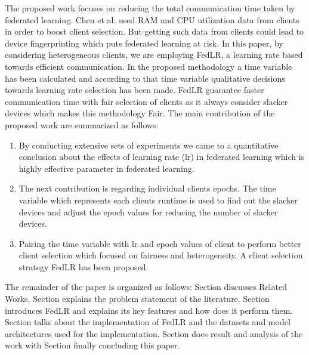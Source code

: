 \documentclass[conference]{IEEEtran}
\newcommand{\RNum}[1]{\uppercase\expandafter{\romannumeral #1\relax}}
\begin{document}
 The proposed work focuses on reducing the total communication time taken by federated learning. Chen et al. \cite{chen2023boosting} used RAM and CPU utilization data from clients in order to boost client selection. But getting such data from clients could lead to device fingerprinting \cite{radhakrishnan2014gtid} \cite{patwari2022dnn} which puts federated learning at risk.  In this paper, by considering heterogeneous clients, we are employing FedLR, a learning rate based towards efficient communication. In the proposed methodology a time variable has been calculated and according to that time variable qualitative decisions towards learning rate selection has been made.
FedLR guarantee faster communication time with fair selection of clients as it always consider slacker devices which makes this methodology Fair. The main contribution of the proposed work are summarized as follows:
\begin{enumerate}
	\item By conducting extensive sets of experiments we came to a quantitative conclusion about the effects of learning rate (lr) in federated learning which is highly effective parameter in federated learning.
	\item The next contribution is regarding individual clients epochs. The time variable which represents each clients runtime is used to find out the slacker devices and adjust the epoch values for reducing the number of slacker devices.
	\item Pairing the time variable with lr and epoch values of client to perform better client selection which focused on fairness and heterogeneity. A client selection strategy FedLR has been proposed.
\end{enumerate}

The remainder of the paper is organized as follows: Section \RNum{2} discusses Related Works. Section \RNum{3} explains the problem statement of the literature. Section \RNum{4} introduces FedLR and explains its key features and how does it perform them. Section \RNum{5} talks about the implementation of FedLR and the datasets and model architectures used for the implementation. Section \RNum{6} does result and analysis of the work with Section \RNum{7} finally concluding this paper.
\end{document}
